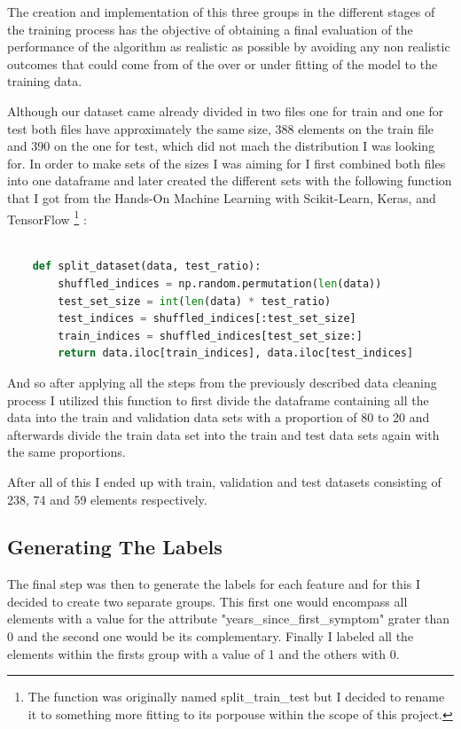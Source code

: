 \documentclass[12pt, a4paper]{article}
\begin{document}
	The creation and implementation of this three groups in the different stages of the training process has the objective of obtaining a final evaluation of the performance of the algorithm as realistic as possible by avoiding any non realistic outcomes that could come from of the over or under fitting of the model to the training data.
	
	Although our dataset came already divided in two files one for train and one for test both files have approximately the same size, 388 elements on the train file and 390 on the one for test, which did not mach the distribution I was looking for. In order to make sets of the sizes I was aiming for I first combined both files into one dataframe and later created the different sets with the following function that I got from the Hands-On Machine Learning with Scikit-Learn, Keras, and TensorFlow \footnote{The function was originally named split\_train\_test but I decided to rename it to something more fitting to its porpouse within the scope of this project.} \cite{handsonmachinelearning}:
	
		\vspace{5mm}
	
	\begin{lstlisting}[language=Python]
		
	def split_dataset(data, test_ratio):
		shuffled_indices = np.random.permutation(len(data))
		test_set_size = int(len(data) * test_ratio)
		test_indices = shuffled_indices[:test_set_size]
		train_indices = shuffled_indices[test_set_size:]
		return data.iloc[train_indices], data.iloc[test_indices]
	\end{lstlisting}
	
	And so after applying all the steps from the previously described data cleaning process I utilized this function to first divide the dataframe containing all the data into the train and validation data sets with a proportion of 80 to 20 and afterwards divide the train data set into the train and test data sets again with the same proportions.
	
	After all of this I ended up with train, validation and test datasets consisting of 238, 74 and 59 elements respectively.
	
	\clearpage
	
	\subsection{Generating The Labels}
	
	The final step was then to generate the labels for each feature and for this I decided to create two separate groups. This first one would encompass all elements with a value for the attribute "years\_since\_first\_symptom" grater than 0 and the second one  would be its complementary. Finally I labeled all the elements within the firsts group with a value of 1 and the others with 0. 
	
\end{document}
